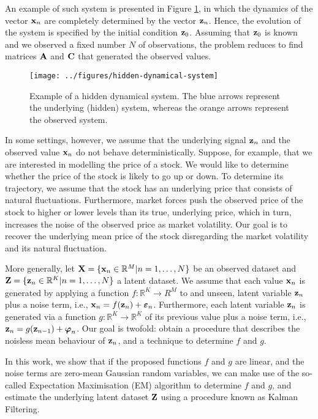 \documentclass[11pt]{article}
\numberwithin{equation}{section}
\newcommand{\x}{{\bf x}}
\newcommand{\X}{{\bf X}}
\newcommand{\z}{{\bf z}}
\newcommand{\Z}{{\bf Z}}
\newcommand{\R}{\mathbb{R}}
\begin{document}
An example of such system is presented in Figure \ref{fig:hidden-dynamical-system}, in which the dynamics of the vector $\x_n$ are completely determined by the vector $\z_n$. Hence, the evolution of the system is specified by the initial condition $\z_0$. Assuming that $\z_0$ is known and we observed a fixed number $N$ of observations, the problem reduces to find matrices ${\bf A}$ and ${\bf C}$ that generated the observed values.

\begin{figure}[h!]
	\centering
	\texttt{[image: ../figures/hidden-dynamical-system]}
	\caption{Example of a hidden dynamical system. The blue arrows represent the underlying (hidden) system, whereas the orange arrows represent the observed system.}
	\label{fig:hidden-dynamical-system}
\end{figure}

In some settings, however, we assume that the underlying signal $\z_n$ and the observed value $\x_n$ do not behave deterministically. Suppose, for example, that we are interested in modelling the price of a stock. We would like to determine whether the price of the stock is likely to go up or down. To determine its trajectory, we assume that the stock has an underlying price that consists of natural fluctuations. Furthermore, market forces push the observed price of the stock to higher or lower levels than its true, underlying price, which in turn, increases the noise of the observed price as market volatility. Our goal is to recover the underlying mean price of the stock disregarding the market volatility and its natural fluctuation.



More generally, let $\X = \{\x_n \in \mathbb{R}^M \vert n=1,\ldots, N\}$ be an observed dataset and $\Z =  \{\z_n \in \mathbb{R}^K \vert n=1,\ldots, N\}$ a latent dataset. We assume that each value $\x_n$ is generated by applying a function $f:\R^K\to R^M$ to and unseen, latent variable $\z_n$ plus a noise term, i.e., $\x_n = f(\z_n) + \boldsymbol\varepsilon_n$. Furthermore, each latent variable $\z_n$ is generated via a function $g:\R^K\to\R^K$ of its previous value plus a noise term, i.e., $\z_n = g(\z_{n-1}) + \boldsymbol{\varphi}_n$. Our goal is twofold: obtain a procedure that describes the noisless mean behaviour of $\z_n$, and a technique to determine $f$ and $g$.

In this work, we show that if the proposed functions $f$ and $g$ are linear, and the noise terms are zero-mean Gaussian random variables, we can make use of the so-called Expectation Maximisation (EM) algorithm to determine $f$ and $g$, and estimate the underlying latent dataset $\Z$ using a procedure known as Kalman Filtering.
\end{document}
